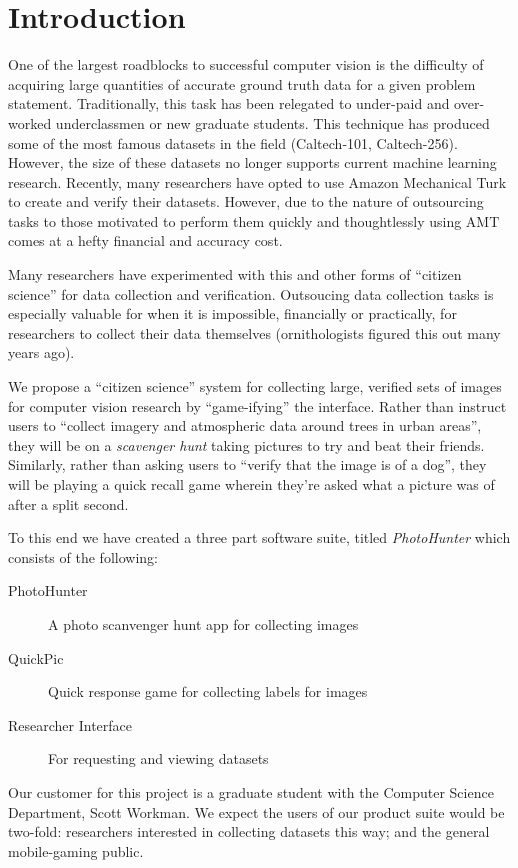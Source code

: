 \documentclass{article}
\begin{document}
\section{Introduction}

One of the largest roadblocks to successful computer vision is the difficulty of
acquiring large quantities of accurate ground truth data for a given problem
statement. Traditionally, this task has been relegated to under-paid and over-worked
underclassmen or new graduate students. This technique has produced some of the
most famous datasets in the field (Caltech-101, Caltech-256). However, the size of
these datasets no longer supports current machine learning research. Recently,
many researchers have opted to use Amazon Mechanical Turk to create and verify their
datasets. However, due to the nature of outsourcing tasks to those motivated to
perform them quickly and thoughtlessly using AMT comes at a hefty financial and
accuracy cost.

Many researchers have experimented with this and other forms of ``citizen science''
for data collection and verification. Outsoucing data collection tasks is especially
valuable for when it is impossible, financially or practically, for researchers to
collect their data themselves (ornithologists figured this out many years ago).

We propose a ``citizen science'' system for collecting large, verified sets of images
for computer vision research by ``game-ifying'' the interface. Rather than instruct
users to ``collect imagery and atmospheric data around trees in urban areas'', they
will be on a {\em scavenger hunt} taking pictures to try and beat their friends.
Similarly, rather than asking users to ``verify that the image is of a dog'', they
will be playing a quick recall game wherein they're asked what a picture was of after
a split second.

To this end we have created a three part software suite, titled {\em PhotoHunter}
which consists of the following:
\begin{description}
	\item[PhotoHunter] A photo scanvenger hunt app for collecting images
	\item[QuickPic] Quick response game for collecting labels for images
	\item[Researcher Interface] For requesting and viewing datasets
\end{description}

Our customer for this project is a graduate student with the Computer Science
Department, Scott Workman. We expect the users of our product suite would be
two-fold: researchers interested in collecting datasets this way; and the general
mobile-gaming public.
\end{document}
